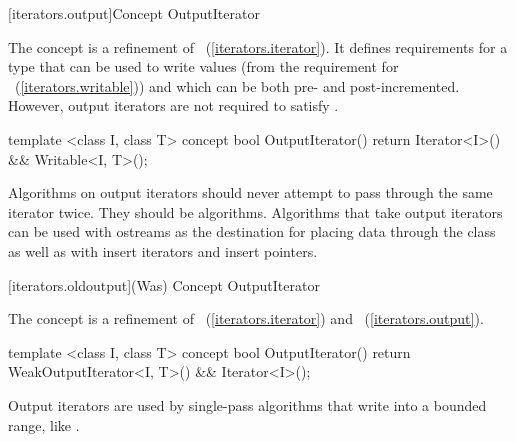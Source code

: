 
[iterators.output]{Concept OutputIterator}


\begin{addedblock}
\pnum
The  concept is a refinement of
~(\ref{iterators.iterator}). It defines requirements for a type that
can be used to write values (from the requirement for
~(\ref{iterators.writable})) and which can be both pre- and post-incremented.
However, output iterators are not required to
satisfy .

%
\begin{codeblock}
  template <class I, class T>
  concept bool OutputIterator() {
    return Iterator<I>() && Writable<I, T>();
  }
\end{codeblock}
\end{addedblock}

\pnum
\enternote
{}
\textit{}
Algorithms on output iterators should never attempt to pass through the same iterator twice.
They should be
algorithms.
Algorithms that take output iterators can be used with ostreams as the destination
for placing data through the
class as well as with insert iterators and insert pointers.
\exitnote

\begin{addedblock}
{\color{oldclr}
[iterators.oldoutput]{(Was) Concept OutputIterator}

\pnum
The  concept is a refinement of ~(\ref{iterators.iterator}) and
~(\ref{iterators.output}).

\begin{codeblock}
  template <class I, class T>
  concept bool OutputIterator() {
    return WeakOutputIterator<I, T>() && Iterator<I>();
  }
\end{codeblock}

\pnum
\enternote Output iterators are used by single-pass
algorithms that write into a bounded range, like .
\exitnote
} %
\end{addedblock}

